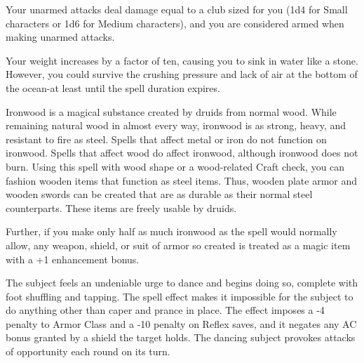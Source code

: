 \begin{multicols}{2}
\begin{small}
\smallskip\noindent Your unarmed attacks deal damage equal to a club sized for you (1d4 for Small characters or 1d6 for Medium characters), and you are considered armed when making unarmed attacks.

\smallskip\noindent Your weight increases by a factor of ten, causing you to sink in water like a stone. However, you could survive the crushing pressure and lack of air at the bottom of the ocean-at least until the spell duration expires.


\noindent Ironwood is a magical substance created by druids from normal wood. While remaining natural wood in almost every way, ironwood is as strong, heavy, and resistant to fire as steel. Spells that affect metal or iron do not function on ironwood. Spells that affect wood do affect ironwood, although ironwood does not burn. Using this spell with wood shape or a wood-related Craft check, you can fashion wooden items that function as steel items. Thus, wooden plate armor and wooden swords can be created that are as durable as their normal steel counterparts. These items are freely usable by druids.

\smallskip\noindent Further, if you make only half as much ironwood as the spell would normally allow, any weapon, shield, or suit of armor so created is treated as a magic item with a +1 enhancement bonus.


\noindent The subject feels an undeniable urge to dance and begins doing so, complete with foot shuffling and tapping. The spell effect makes it impossible for the subject to do anything other than caper and prance in place. The effect imposes a -4 penalty to Armor Class and a -10 penalty on Reflex saves, and it negates any AC bonus granted by a shield the target holds. The dancing subject provokes attacks of opportunity each round on its turn.


\end{small}
\end{multicols}
